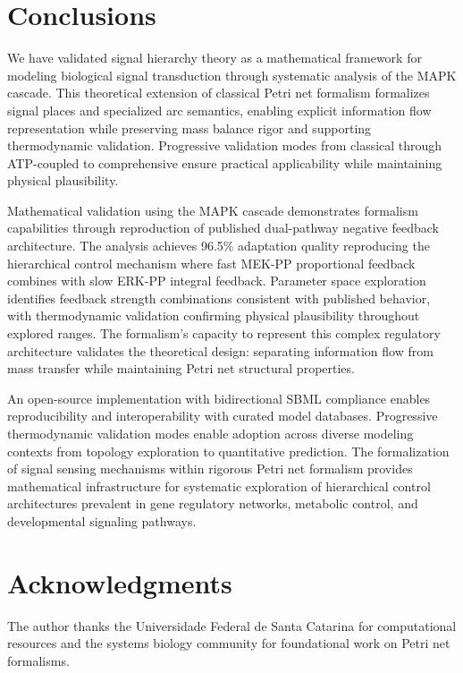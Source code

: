 \documentclass[twocolumn,11pt]{article}
\begin{document}
\section{Conclusions}

We have validated signal hierarchy theory as a mathematical framework for modeling biological signal transduction through systematic analysis of the MAPK cascade. This theoretical extension of classical Petri net formalism formalizes signal places and specialized arc semantics, enabling explicit information flow representation while preserving mass balance rigor and supporting thermodynamic validation. Progressive validation modes from classical through ATP-coupled to comprehensive ensure practical applicability while maintaining physical plausibility.

Mathematical validation using the MAPK cascade demonstrates formalism capabilities through reproduction of published dual-pathway negative feedback architecture. The analysis achieves 96.5\% adaptation quality reproducing the hierarchical control mechanism where fast MEK-PP proportional feedback combines with slow ERK-PP integral feedback. Parameter space exploration identifies feedback strength combinations consistent with published behavior, with thermodynamic validation confirming physical plausibility throughout explored ranges. The formalism's capacity to represent this complex regulatory architecture validates the theoretical design: separating information flow from mass transfer while maintaining Petri net structural properties.

An open-source implementation with bidirectional SBML compliance enables reproducibility and interoperability with curated model databases. Progressive thermodynamic validation modes enable adoption across diverse modeling contexts from topology exploration to quantitative prediction. The formalization of signal sensing mechanisms within rigorous Petri net formalism provides mathematical infrastructure for systematic exploration of hierarchical control architectures prevalent in gene regulatory networks, metabolic control, and developmental signaling pathways.

\section*{Acknowledgments}

The author thanks the Universidade Federal de Santa Catarina for computational resources and the systems biology community for foundational work on Petri net formalisms.
\end{document}
